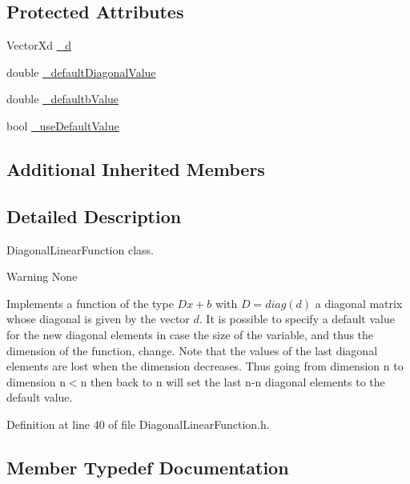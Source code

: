 \subsection*{Protected Attributes}
\begin{DoxyCompactItemize}
\item 
Vector\+Xd \hyperlink{classocra_1_1DiagonalLinearFunction_adf9d157af394f4322d71720bea545f00}{\+\_\+d}
\item 
double \hyperlink{classocra_1_1DiagonalLinearFunction_aa7150368fce9c7c6c3724b801f498749}{\+\_\+default\+Diagonal\+Value}
\item 
double \hyperlink{classocra_1_1DiagonalLinearFunction_ab004421a9f01bd2c3fa5b97b7532c6c2}{\+\_\+defaultb\+Value}
\item 
bool \hyperlink{classocra_1_1DiagonalLinearFunction_a27e25618f0812c42967b363ad3f77fd6}{\+\_\+use\+Default\+Value}
\end{DoxyCompactItemize}
\subsection*{Additional Inherited Members}


\subsection{Detailed Description}
Diagonal\+Linear\+Function class. 

\begin{DoxyWarning}{Warning}
None
\end{DoxyWarning}
Implements a function of the type $ Dx+b $ with $ D=diag(d) $ a diagonal matrix whose diagonal is given by the vector $ d $. It is possible to specify a default value for the new diagonal elements in case the size of the variable, and thus the dimension of the function, change. Note that the values of the last diagonal elements are lost when the dimension decreases. Thus going from dimension n to dimension n\textquotesingle{}$<$n then back to n will set the last n-\/n\textquotesingle{} diagonal elements to the default value. 

Definition at line 40 of file Diagonal\+Linear\+Function.\+h.



\subsection{Member Typedef Documentation}
\hypertarget{classocra_1_1DiagonalLinearFunction_ab1d33ba63aea16f86fa88bf574333a39}{}\label{classocra_1_1DiagonalLinearFunction_ab1d33ba63aea16f86fa88bf574333a39} 
